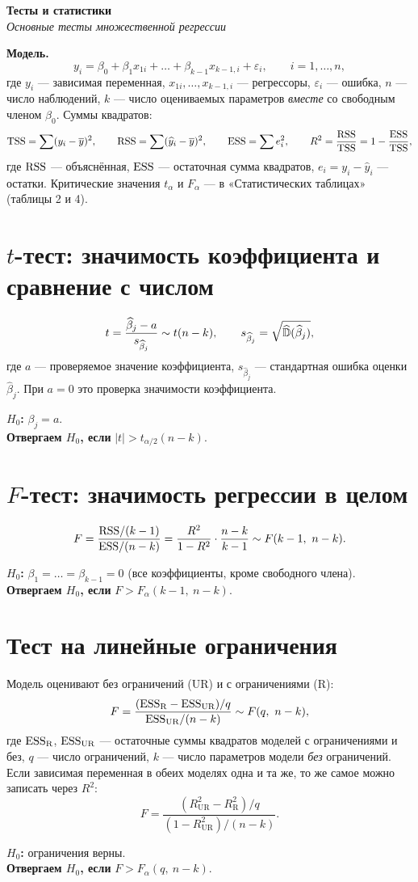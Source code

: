 \documentclass[12pt,a4paper]{article}
\newcommand{\decision}[2]{\par\smallskip\noindent\textbf{$H_0$:} #1\\
  \textbf{Отвергаем $H_0$, если} #2\par}
\begin{document}
\begin{center}
  {\LARGE\bfseries\color{accent} Тесты и статистики}\\[3pt]
  {\itshape Основные тесты множественной регрессии}
\end{center}

\medskip
\noindent\textbf{Модель.}
\[
  y_i = \beta_0 + \beta_1x_{1i} + \dots + \beta_{k-1}x_{k-1,i} + \varepsilon_i,
  \qquad i = 1, \dots, n,
\]
где $y_i$ — зависимая переменная, $x_{1i}, \dots, x_{k-1,i}$ — регрессоры,
$\varepsilon_i$ — ошибка, $n$ — число наблюдений, $k$ — число оцениваемых
параметров \emph{вместе} со свободным членом $\beta_0$. Суммы квадратов:
\[
  \mathrm{TSS} = \sum(y_i - \overline{y})^2,
  \qquad
  \mathrm{RSS} = \sum(\widehat y_i - \overline{y})^2,
  \qquad
  \mathrm{ESS} = \sum e_i^2,
  \qquad
  R^2 = \frac{\mathrm{RSS}}{\mathrm{TSS}} = 1 - \frac{\mathrm{ESS}}{\mathrm{TSS}},
\]
где $\mathrm{RSS}$ — объяснённая, $\mathrm{ESS}$ — остаточная сумма квадратов,
$e_i = y_i - \widehat y_i$ — остатки. Критические значения $t_\alpha$ и
$F_\alpha$ — в «Статистических таблицах» (таблицы 2 и 4).

\section{\texorpdfstring{$t$}{t}-тест: значимость коэффициента и сравнение с числом}
\[
  t = \frac{\widehat\beta_j - a}{s_{\widehat\beta_j}} \sim t(n - k),
  \qquad
  s_{\widehat\beta_j} = \sqrt{\widehat{\mathbb{D}}(\widehat\beta_j)},
\]
где $a$ — проверяемое значение коэффициента, $s_{\widehat\beta_j}$ —
стандартная ошибка оценки $\widehat\beta_j$. При $a = 0$ это проверка
значимости коэффициента.
\decision{$\beta_j = a$.}{$|t| > t_{\alpha/2}(n - k)$.}

\section{\texorpdfstring{$F$}{F}-тест: значимость регрессии в целом}
\[
  F = \frac{\mathrm{RSS}/(k - 1)}{\mathrm{ESS}/(n - k)}
    = \frac{R^2}{1 - R^2}\cdot\frac{n - k}{k - 1} \sim F(k - 1,\ n - k).
\]
\decision{$\beta_1 = \dots = \beta_{k-1} = 0$ (все коэффициенты, кроме
свободного члена).}{$F > F_\alpha(k - 1,\ n - k)$.}

\section{Тест на линейные ограничения}
Модель оценивают без ограничений (UR) и с ограничениями (R):
\[
  F = \frac{(\mathrm{ESS}_{\mathrm R} - \mathrm{ESS}_{\mathrm{UR}})/q}{\mathrm{ESS}_{\mathrm{UR}}/(n - k)}
    \sim F(q,\ n - k),
\]
где $\mathrm{ESS}_{\mathrm R}$, $\mathrm{ESS}_{\mathrm{UR}}$ — остаточные суммы квадратов
моделей с ограничениями и без, $q$ — число ограничений, $k$ — число
параметров модели \emph{без} ограничений. Если зависимая переменная в обеих
моделях одна и та же, то же самое можно записать через $R^2$:
\[
  F = \frac{(R^2_{\mathrm{UR}} - R^2_{\mathrm R})/q}{(1 - R^2_{\mathrm{UR}})/(n - k)} .
\]
\decision{ограничения верны.}{$F > F_\alpha(q,\ n - k)$.}
\end{document}
